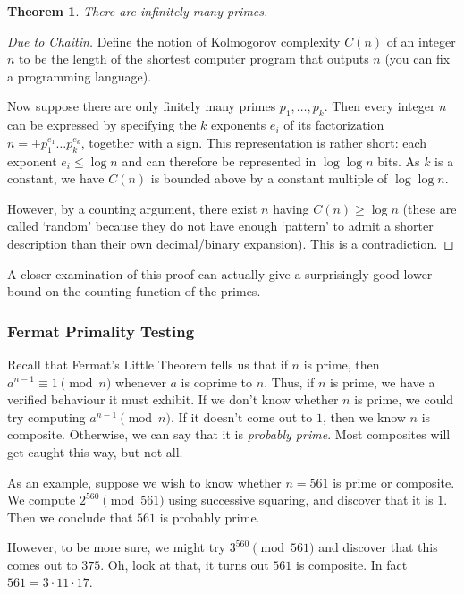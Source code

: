 \documentclass{article}
\theoremstyle{plain}
\newtheorem{theorem}{Theorem}
\theoremstyle{definition}
\theoremstyle{remark}
\numberwithin{theorem}{section}
\begin{document}
\begin{theorem}
    There are infinitely many primes.
\end{theorem}

\begin{proof}[Due to Chaitin]
	Define the notion of Kolmogorov complexity $C(n)$ of an integer $n$ to be the length of the shortest computer program that outputs $n$ (you can fix a programming language).

	Now suppose there are only finitely many primes $p_1, \ldots, p_k$.  Then every integer $n$ can be expressed by specifying the $k$ exponents $e_i$ of its factorization $n = \pm p_1^{e_1} \ldots p_k^{e_k}$, together with a sign.  This representation is rather short:  each exponent $e_i \le \log n$ and can therefore be represented in $\log \log n$ bits.  As $k$ is a constant, we have $C(n)$ is bounded above by a constant multiple of $\log \log n$.  

	However, by a counting argument, there exist $n$ having $C(n) \ge \log n$ (these are called `random' because they do not have enough `pattern' to admit a shorter description than their own decimal/binary expansion).  This is a contradiction.
\end{proof}

A closer examination of this proof can actually give a surprisingly good lower bound on the counting function of the primes.


\subsubsection{Fermat Primality Testing}

Recall that Fermat's Little Theorem tells us that if $n$ is prime, then $a^{n-1} \equiv 1 \pmod{n}$ whenever $a$ is coprime to $n$.  Thus, if $n$ is prime, we have a verified behaviour it must exhibit.  If we don't know whether $n$ is prime, we could try computing $a^{n-1} \pmod {n}$.  If it doesn't come out to $1$, then we know $n$ is composite.  Otherwise, we can say that it is \emph{probably prime}.  Most composites will get caught this way, but not all.

As an example, suppose we wish to know whether $n=561$ is prime or composite.  We compute $2^{560} \pmod{561}$ using successive squaring, and discover that it is $1$.  Then we conclude that $561$ is probably prime.

However, to be more sure, we might try $3^{560} \pmod{561}$ and discover that this comes out to $375$.  Oh, look at that, it turns out $561$ is composite.  In fact $561=3 \cdot 11 \cdot 17$.
\end{document}
